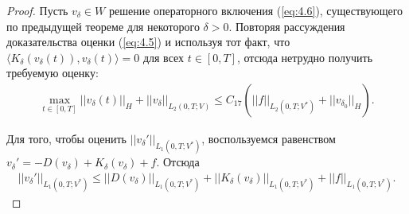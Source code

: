 \documentclass[14pt, a4paper]{extarticle}
\numberwithin{equation}{section}
\begin{document}
    \begin{proof}
        Пусть $v_\delta \in W$ решение операторного включения (\ref{eq:4.6}), существующего
        по предыдущей теореме для некоторого $\delta > 0$. Повторяя рассуждения доказательства оценки
        (\ref{eq:4.5}) и используя тот факт, что $ \langle K_\delta(v_\delta(t)), v_\delta(t) \rangle = 0$
        для всех $t \in [0,T]$, отсюда нетрудно получить требуемую оценку:
        \begin{equation*}
            \begin{gathered}
                \max_{t \in [0,T]} ||v_\delta(t)||_H + ||v_\delta||_{L_2(0,T;V)} \leq
                C_{17} (||f||_{L_2(0,T;V^*)} + ||v_{\delta_0}||_H).
            \end{gathered}
        \end{equation*}

        Для того, чтобы оценить $||v_\delta'||_{L_1(0,T;V^*)}$, воспользуемся равенством
        $v_\delta' = -D(v_\delta) + K_\delta(v_\delta) + f$. Отсюда
        \begin{equation}\label{eq:5.5}
            \begin{gathered}
                ||v_\delta'||_{L_1(0,T;V^*)} \leq ||D(v_\delta)||_{L_1(0,T;V^*)} +
                ||K_\delta(v_\delta)||_{L_1(0,T;V^*)} + ||f||_{L_1(0,T;V^*)}.
            \end{gathered}
        \end{equation}


\end{proof}
\end{document}
